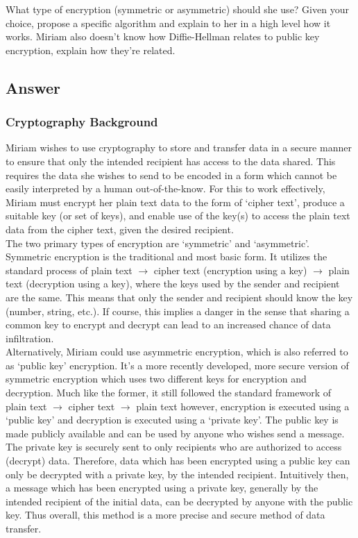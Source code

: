 \documentclass[11pt, english]{article}
\begin{document}
	What type of encryption (symmetric or asymmetric) should she use? Given your choice, propose a specific algorithm and explain to her in a high level how it works. Miriam also doesn't know how Diffie-Hellman relates to public key encryption, explain how they're related.

	\subsection{Answer}

		\subsubsection{Cryptography Background}

	Miriam wishes to use cryptography to store and transfer data in a secure manner to ensure that only the intended recipient has access to the data shared. This requires the data she wishes to send to be encoded in a form which cannot be easily interpreted by a human out-of-the-know. For this to work effectively, Miriam must encrypt her plain text data to the form of `cipher text', produce a suitable key (or set of keys), and enable use of the key(s) to access the plain text data from the cipher text, given the desired recipient.\\

	The two primary types of encryption are `symmetric' and `asymmetric'. Symmetric encryption is the traditional and most basic form. It utilizes the standard process of plain text $\rightarrow$ cipher text (encryption using a key) $\rightarrow$ plain text (decryption using a key), where the keys used by the sender and recipient are the same. This means that only the sender and recipient should know the key (number, string, etc.). If course, this implies a danger in the sense that sharing a common key to encrypt and decrypt can lead to an increased chance of data infiltration.\\

	Alternatively, Miriam could use asymmetric encryption, which is also referred to as `public key' encryption. It's a more recently developed, more secure version of symmetric encryption which uses two different keys for encryption and decryption. Much like the former, it still followed the standard framework of plain text $\rightarrow$ cipher text $\rightarrow$ plain text however, encryption is executed using a `public key' and decryption is executed using a `private key'. The public key is made publicly available and can be used by anyone who wishes send a message. The private key is securely sent to only recipients who are authorized to access (decrypt) data. Therefore, data which has been encrypted using a public key can only be decrypted with a private key, by the intended recipient. Intuitively then, a message which has been encrypted using a private key, generally by the intended recipient of the initial data, can be decrypted by anyone with the public key. Thus overall, this method is a more precise and secure method of data transfer.
\end{document}
